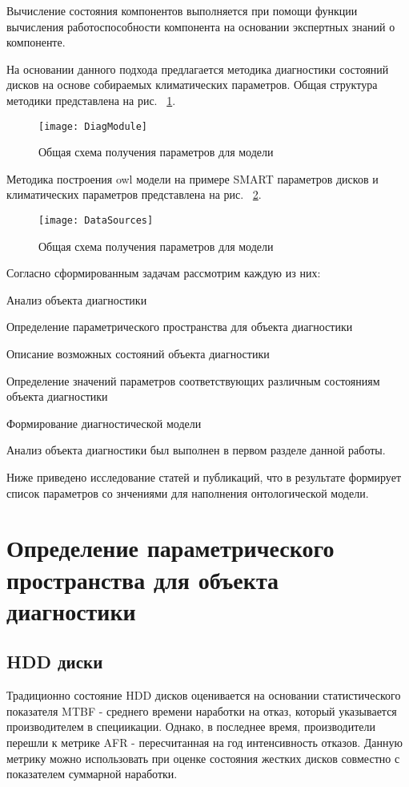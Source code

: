 Вычисление  состояния  компонентов  выполняется  при  помощи функции вычисления работоспособности компонента на основании экспертных знаний о компоненте.

На основании данного подхода предлагается методика диагностики состояний дисков на основе собираемых климатических параметров. Общая структура методики представлена на рис. ~\ref{fig:DiagModule}.
\begin{figure}[h]
	\centering
	\texttt{[image: DiagModule]}
	\caption{Общая схема получения параметров для модели}
	\label{fig:DiagModule}
\end{figure}

Методика построения owl модели на примере SMART параметров дисков и климатических параметров представлена на рис. ~\ref{fig:DataSources}.

\begin{figure}[h]
	\centering
	\texttt{[image: DataSources]}
	\caption{Общая схема получения параметров для модели}
	\label{fig:DataSources}
\end{figure}

Согласно сформированным задачам рассмотрим каждую из них: 
\begin{itemize*}
	\item{Анализ объекта диагностики}
	\item{Определение параметрического пространства для объекта диагностики}
	\item{Описание возможных состояний объекта диагностики}
	\item{Определение значений параметров соответствующих различным состояниям объекта диагностики}
	\item{Формирование диагностической модели}
\end{itemize*}

Анализ объекта диагностики был выполнен в первом разделе данной работы. 

Ниже приведено исследование статей и публикаций, что в результате формирует список параметров со знчениями для наполнения онтологической модели.

\section{Определение параметрического пространства для объекта диагностики}

\subsection{HDD диски}
Традиционно состояние HDD дисков оценивается на основании статистического показателя MTBF - среднего времени наработки на отказ, который указывается производителем в специикации. Однако, в последнее время, производители перешли к метрике AFR - пересчитанная на год интенсивность отказов. Данную метрику можно использовать при оценке состояния жестких дисков совместно с показателем суммарной наработки.  

